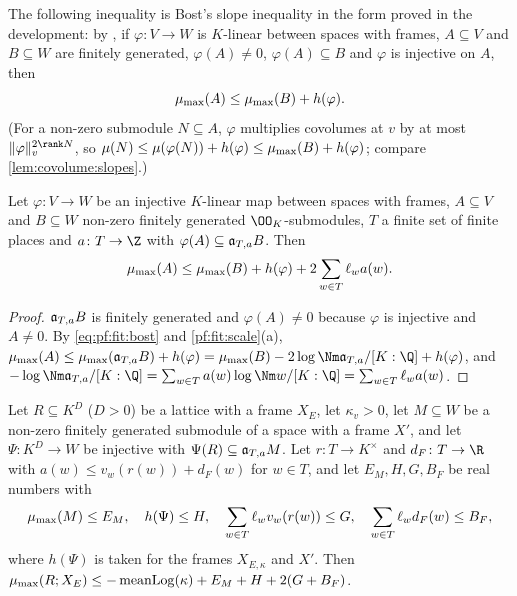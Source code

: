 The following inequality is Bost's slope inequality \cite{Bost1996,Bost2001} in the form proved in the development:
by , if $\varphi\colon V\to W$ is $K$-linear between spaces with frames,
$A\subseteq V$ and $B\subseteq W$ are finitely generated, $\varphi(A)\ne0$, $\varphi(A)\subseteq B$ and $\varphi$ is
injective on $A$, then
\begin{equation}\label{eq:pf:fit:bost}
\mu_{\max}(A)\le\mu_{\max}(B)+h(\varphi).
\end{equation}
(For a non-zero submodule $N\subseteq A$, $\varphi$ multiplies covolumes at $v$ by at most $\|\varphi\|_v^{2\rank N}$, so
$\mu(N)\le\mu(\varphi(N))+h(\varphi)\le\mu_{\max}(B)+h(\varphi)$; compare \cref{lem:covolume:slopes}.)

\begin{proposition}\label{pf:fit:slopeden}
Let $\varphi\colon V\to W$ be an injective $K$-linear map between spaces with frames, $A\subseteq V$ and $B\subseteq W$
non-zero finitely generated $\OO_K$-submodules, $T$ a finite set of finite places and $a\colon T\to\Z$ with
$\varphi(A)\subseteq\mathfrak{a}_{T,a}B$. Then
\[
\mu_{\max}(A)\le\mu_{\max}(B)+h(\varphi)+2\sum_{w\in T}\ell_wa(w).
\]
\end{proposition}

\begin{proof}
$\mathfrak{a}_{T,a}B$ is finitely generated and $\varphi(A)\ne0$ because $\varphi$ is injective and $A\ne0$. By
\eqref{eq:pf:fit:bost} and \cref{pf:fit:scale}(a),
$\fitmumax(A)\le\fitmumax(\fitden_{T,a}B)+h(\varphi)=\fitmumax(B)-2\log\Nm\fitden_{T,a}/[K:\Q]+h(\varphi)$, and
$-\log\Nm\fitden_{T,a}/[K:\Q]=\sum_{w\in T}a(w)\log\Nm w/[K:\Q]=\sum_{w\in T}\ell_wa(w)$.
\end{proof}

\begin{proposition}\label{pf:fit:largest}
Let $R\subseteq K^D$ ($D>0$) be a lattice with a frame $X_E$, let $\kappa_v>0$, let $M\subseteq W$ be a non-zero
finitely generated submodule of a space with a frame $X'$, and let $\Psi\colon K^D\to W$ be injective with
$\Psi(R)\subseteq\mathfrak{a}_{T,a}M$. Let $r\colon T\to K^\times$ and $d_F\colon T\to\R$ with $a(w)\le v_w(r(w))+d_F(w)$
for $w\in T$, and let $E_M,H,G,B_F$ be real numbers with
\[
\mu_{\max}(M)\le E_M,\quad h(\Psi)\le H,\quad\sum_{w\in T}\ell_wv_w(r(w))\le G,\quad\sum_{w\in T}\ell_wd_F(w)\le B_F,
\]
where $h(\Psi)$ is taken for the frames $X_{E,\kappa}$ and $X'$. Then
$\mu_{\max}(R;X_E)\le-\operatorname{meanLog}(\kappa)+E_M+H+2(G+B_F)$.
\end{proposition}

